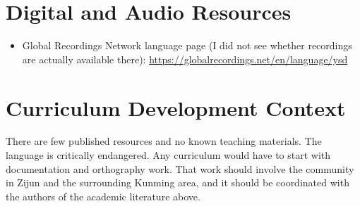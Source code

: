 \documentclass[12pt]{article}
\begin{document}
\section{Digital and Audio Resources}
\begin{itemize}
\item Global Recordings Network language page (I did not see whether recordings are actually available there): \url{https://globalrecordings.net/en/language/ysd}
\end{itemize}

\section{Curriculum Development Context}
There are few published resources and no known teaching materials. The language is critically endangered. Any curriculum would have to start with documentation and orthography work. That work should involve the community in Zijun and the surrounding Kunming area, and it should be coordinated with the authors of the academic literature above.
\end{document}
